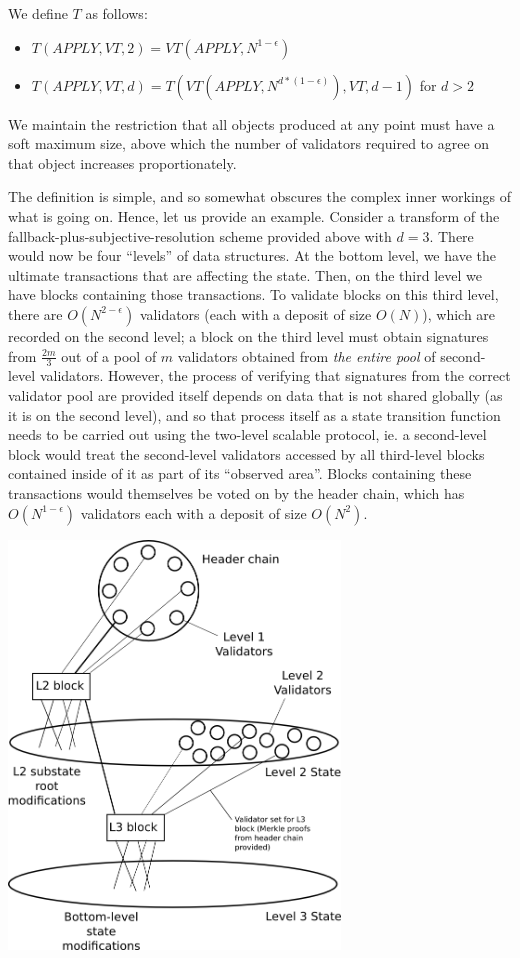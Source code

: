 \documentclass[11pt,a4paper]{report}
\theoremstyle{plain}
\theoremstyle{definition}
\theoremstyle{remark}
\begin{document}
We define $T$ as follows:

\begin{itemize}
\item
$T(APPLY, VT, 2) = VT(APPLY, N^{1-\epsilon})$
\item
$T(APPLY, VT, d) = T(VT(APPLY, N^{d*(1-\epsilon)}), VT, d-1)$ for $d > 2$
\end{itemize}

We maintain the restriction that all objects produced at any point must have a soft maximum size, above which the number of validators required to agree on that object increases proportionately.

The definition is simple, and so somewhat obscures the complex inner workings of what is going on. Hence, let us provide an example. Consider a transform of the fallback-plus-subjective-resolution scheme provided above with $d = 3$. There would now be four ``levels'' of data structures. At the bottom level, we have the ultimate transactions that are affecting the state. Then, on the third level we have blocks containing those transactions. To validate blocks on this third level, there are $O(N^{2-\epsilon})$ validators (each with a deposit of size $O(N)$), which are recorded on the second level; a block on the third level must obtain signatures from $\frac{2m}{3}$ out of a pool of $m$ validators obtained from \emph{the entire pool} of second-level validators. However, the process of verifying that signatures from the correct validator pool are provided itself depends on data that is not shared globally (as it is on the second level), and so that process itself as a state transition function needs to be carried out using the two-level scalable protocol, ie. a second-level block would treat the second-level validators accessed by all third-level blocks contained inside of it as part of its ``observed area''. Blocks containing these transactions would themselves be voted on by the header chain, which has $O(N^{1-\epsilon})$ validators each with a deposit of size $O(N^2)$.

\begin{center}
\includegraphics[width=250pt]{multilevel.png}
\end{center}
\end{document}
